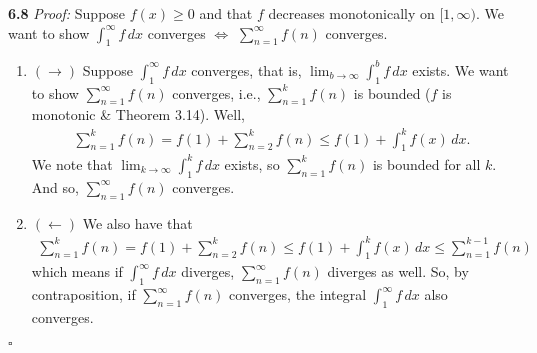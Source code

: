 \documentclass[11pt]{article}
\begin{document}
\noindent \textbf{6.8}
\noindent \textit{Proof:} Suppose $f(x) \geq 0$ and that $f$ decreases monotonically on $[1,\infty)$. We want to show $\int^\infty_1 f\,dx$ converges $\iff$ $\sum^\infty_{n=1} f(n)$ converges.  
\begin{enumerate}
	\item $(\to)$ Suppose $\int^\infty_1f\,dx$ converges, that is, $\lim_{b\to \infty} \int_1^b f\,dx$ exists. We want to show $\sum^\infty_{n=1}f(n)$ converges, i.e., $\sum^{k}_{n=1}f(n)$ is bounded ($f$ is monotonic \& Theorem 3.14). Well, 
	\begin{align*}
	\sum^k_{n=1}f(n) = f(1) + \sum^k_{n=2}f(n)\leq f(1) + \int^k_{1}f(x)\,dx.
	\end{align*}   
	We note that $\lim_{k\to \infty} \int^k_{1} f\,dx$ exists, so $\sum^k_{n=1}f(n)$ is bounded for all $k$. And so, $\sum^\infty_{n=1} f(n)$ converges. 
	
	\item $(\leftarrow)$ We also have that 
	\begin{align*}
	\sum^k_{n=1}f(n) = f(1) + \sum^k_{n=2}f(n)\leq f(1) + \int^k_{1}f(x)\,dx \leq \sum^{k-1}_{n=1}f(n)
	\end{align*}
	which means if $\int^\infty_{1}f\,dx$ diverges, $\sum^\infty_{n=1}f(n)$ diverges as well. So, by contraposition, if $\sum^\infty_{n=1}f(n)$ converges, the integral $\int^\infty_1 f\,dx$ also converges. 
\end{enumerate}\hfill $\square$
  
\end{document}
